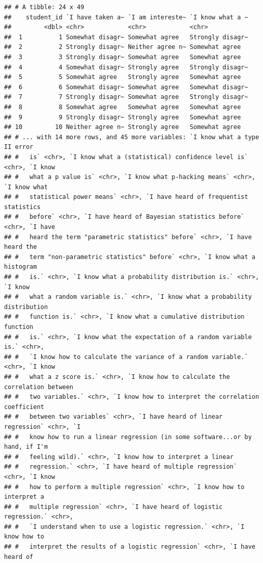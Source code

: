 \documentclass[
]{book}
\begin{document}
\begin{verbatim}
## # A tibble: 24 x 49
##    student_id `I have taken a~ `I am intereste~ `I know what a ~
##         <dbl> <chr>            <chr>            <chr>           
##  1          1 Somewhat disagr~ Somewhat agree   Strongly disagr~
##  2          2 Strongly disagr~ Neither agree n~ Somewhat agree  
##  3          3 Strongly disagr~ Somewhat agree   Somewhat agree  
##  4          4 Somewhat disagr~ Strongly agree   Strongly disagr~
##  5          5 Somewhat agree   Strongly agree   Somewhat agree  
##  6          6 Somewhat disagr~ Somewhat agree   Somewhat disagr~
##  7          7 Strongly disagr~ Somewhat agree   Strongly disagr~
##  8          8 Somewhat agree   Somewhat agree   Somewhat agree  
##  9          9 Strongly disagr~ Strongly agree   Somewhat agree  
## 10         10 Neither agree n~ Strongly agree   Somewhat agree  
## # ... with 14 more rows, and 45 more variables: `I know what a type II error
## #   is` <chr>, `I know what a (statistical) confidence level is` <chr>, `I know
## #   what a p value is` <chr>, `I know what p-hacking means` <chr>, `I know what
## #   statistical power means` <chr>, `I have heard of frequentist statistics
## #   before` <chr>, `I have heard of Bayesian statistics before` <chr>, `I have
## #   heard the term "parametric statistics" before` <chr>, `I have heard the
## #   term "non-parametric statistics" before` <chr>, `I know what a histogram
## #   is.` <chr>, `I know what a probability distribution is.` <chr>, `I know
## #   what a random variable is.` <chr>, `I know what a probability distribution
## #   function is.` <chr>, `I know what a cumulative distribution function
## #   is.` <chr>, `I know what the expectation of a random variable is.` <chr>,
## #   `I know how to calculate the variance of a random variable.` <chr>, `I know
## #   what a z score is.` <chr>, `I know how to calculate the correlation between
## #   two variables.` <chr>, `I know how to interpret the correlation coefficient
## #   between two variables` <chr>, `I have heard of linear regression` <chr>, `I
## #   know how to run a linear regression (in some software...or by hand, if I'm
## #   feeling wild).` <chr>, `I know how to interpret a linear
## #   regression.` <chr>, `I have heard of multiple regression` <chr>, `I know
## #   how to perform a multiple regression` <chr>, `I know how to interpret a
## #   multiple regression` <chr>, `I have heard of logistic regression.` <chr>,
## #   `I understand when to use a logistic regression.` <chr>, `I know how to
## #   interpret the results of a logistic regression` <chr>, `I have heard of

\end{verbatim}
\end{document}
